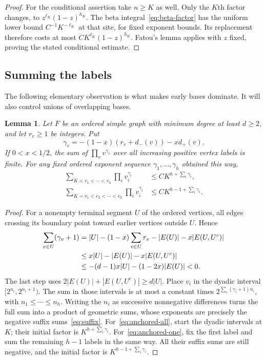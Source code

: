\documentclass[11pt]{article}
\newtheorem{lemma}[theorem]{Lemma}
\theoremstyle{remark}\newtheorem{remark}[theorem]{Remark}
\begin{document}
\begin{proof}
For the conditional assertion take $n\ge K$ as well. Only the $K$th
factor changes, to $z^{\ell_K}(1-z)^{h_K}$.
The beta integral~\eqref{eq:beta-factor} has the uniform lower bound
$C^{-1}K^{-\ell_K}$ at that site, for fixed exponent bounds.
Its replacement therefore costs at most
$C K^{\ell_K}(1-z)^{h_K}$. Fatou's lemma applies with $z$ fixed,
proving the stated conditional estimate.
\end{proof}

\subsection{Summing the labels}
The following elementary observation is what makes early bases dominate.
It will also control unions of overlapping bases.

\begin{lemma}\label{lem:sums}
Let $F$ be an ordered simple graph with minimum degree at least $d\ge2$,
and let $r_v\ge1$ be integers. Put
\[
 \gamma_v=-(1-x)(r_v+d_-(v))-x d_+(v).
\]
If $0<x<1/2$, the sum of $\prod_vv^{\gamma_v}$ over all increasing
positive vertex labels is finite. For any fixed ordered exponent sequence
$\gamma_1,\ldots,\gamma_h$ obtained this way,
\begin{align}
 \sum_{K<v_1<\cdots<v_h}\prod_i v_i^{\gamma_i}
 &\le C K^{h+\sum_i\gamma_i},\label{eq:anchored-all}\\
 \sum_{K=v_1<v_2<\cdots<v_h}\prod_i v_i^{\gamma_i}
 &\le C K^{h-1+\sum_i\gamma_i}.\label{eq:anchored-one}
\end{align}
\end{lemma}
\begin{proof}
For a nonempty terminal segment $U$ of the ordered vertices, all edges
crossing its boundary point toward earlier vertices outside $U$. Hence
\begin{align}
 \sum_{v\in U}(\gamma_v+1)
 &=|U|-(1-x)\sum_{v\in U}r_v-|E(U)|-x|E(U,U^c)|\notag\\
 &\le x|U|-|E(U)|-x|E(U,U^c)|\notag\\
 &\le-(d-1)x|U|-(1-2x)|E(U)|<0.\label{eq:suffix}
\end{align}
The last step uses $2|E(U)|+|E(U,U^c)|\ge d|U|$.
Place $v_i$ in the dyadic interval $[2^{n_i},2^{n_i+1})$.
The sum in those intervals is at most a constant times
$2^{\sum_i(\gamma_i+1)n_i}$, with $n_1\le\cdots\le n_h$.
Writing the $n_i$ as successive nonnegative differences turns the full sum
into a product of geometric sums, whose exponents are precisely the
negative suffix sums~\eqref{eq:suffix}.
For~\eqref{eq:anchored-all}, start the dyadic intervals at $K$; their
initial factor is $K^{h+\sum_i\gamma_i}$.
For~\eqref{eq:anchored-one}, fix the first label and sum the remaining
$h-1$ labels in the same way. All their suffix sums are still negative,
and the initial factor is $K^{h-1+\sum_i\gamma_i}$.
\end{proof}
\end{document}
